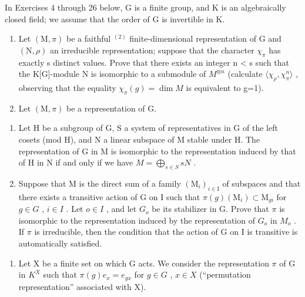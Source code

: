 In Exercises 4 through 26 below, G is a finite group, and K is an algebraically closed field; we assume that the order of G is invertible in K.

\begin{enumerate}
\def\labelenumi{\arabic{enumi})}
\setcounter{enumi}{3}
\item
  Let \((\mathrm{M},\pi)\) be a faithful \(^{(2)}\) finite-dimensional representation of G and \((\mathrm{N},\rho)\) an irreducible representation; suppose that the character \(\chi_{\pi}\) has exactly s distinct values. Prove that there exists an integer n \textless{} s such that the K{[}G{]}-module N is isomorphic to a submodule of \(M^{\otimes n}\) (calculate \(\langle\chi_{\rho},\chi_{\pi}^{n}\rangle\) , observing that the equality \(\chi_{\pi}(g)=\dim M\) is equivalent to g=1).
\item
  Let \((\mathrm{M},\pi)\) be a representation of G.
\end{enumerate}

\begin{enumerate}
\def\labelenumi{\alph{enumi})}
\item
  Let H be a subgroup of G, S a system of representatives in G of the left cosets (mod H), and N a linear subspace of M stable under H. The representation of G in M is isomorphic to the representation induced by that of H in N if and only if we have \(M = \bigoplus_{s \in S} sN\) .
\item
  Suppose that M is the direct sum of a family \((\mathrm{M}_{i})_{i\in\mathrm{I}}\) of subspaces and that there exists a transitive action of G on I such that \(\pi(g)(\mathrm{M}_{i})\subset\mathrm{M}_{gi}\) for \(g\in G\) , \(i\in I\) . Let \(o\in I\) , and let \(G_{o}\) be its stabilizer in G. Prove that \(\pi\) is isomorphic to the representation induced by the representation of \(G_{o}\) in \(M_{o}\) . If \(\pi\) is irreducible, then the condition that the action of G on I is transitive is automatically satisfied.
\end{enumerate}

\begin{enumerate}
\def\labelenumi{\arabic{enumi})}
\setcounter{enumi}{5}
\tightlist
\item
  Let X be a finite set on which G acts. We consider the representation \(\pi\) of G in \(K^{X}\) such that \(\pi(g)e_{x}=e_{gx}\) for \(g\in G\) , \(x\in X\) (``permutation representation'' associated with X).
\end{enumerate}

